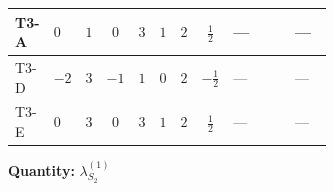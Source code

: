 \documentclass[8pt]{article}
\begin{document}
\begin{landscape}
\begin{longtable}{@{}llcccccc >{\raggedright\arraybackslash}p{0.21\linewidth} >{\raggedright\arraybackslash}p{0.21\linewidth} >{\raggedright\arraybackslash}p{0.21\linewidth}@{}}
\midrule
T3-A & $0$ & $1$ & $0$ & $3$ & $1$ & $2$ & $\frac{1}{2}$ & --- & \scriptsize\adjustbox{max width=\linewidth}{$\begin{gathered} +2 {\lambda_{12}^{(1)}}^2\end{gathered}$} & --- \\
\midrule
T3-D & $-2$ & $3$ & $-1$ & $1$ & $0$ & $2$ & $-\frac{1}{2}$ & --- & \scriptsize\adjustbox{max width=\linewidth}{$\begin{gathered} 6 {\lambda_{12}^{(1)}}^2\end{gathered}$} & --- \\
\midrule
T3-E & $0$ & $3$ & $0$ & $3$ & $1$ & $2$ & $\frac{1}{2}$ & --- & \scriptsize\adjustbox{max width=\linewidth}{$\begin{gathered} +6 {\lambda_{12}^{(1)}}^2\end{gathered}$} & --- \\
\midrule
\bottomrule
\end{longtable}
\clearpage
\noindent\textbf{Quantity: }$\lambda_{S_2}^{(1)}$\par\smallskip

\end{landscape}
\end{document}
